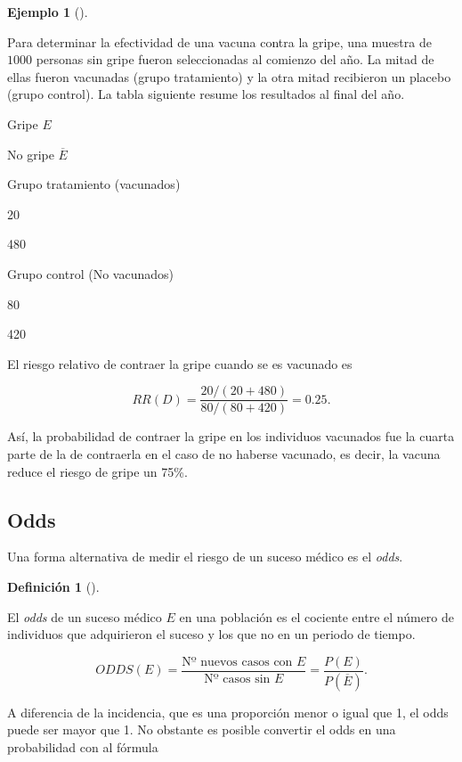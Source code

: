 \documentclass[
  spanish,
  a4paper,
]{scrreport}
\theoremstyle{plain}
\theoremstyle{definition}
\newtheorem{example}{Ejemplo}[chapter]
\theoremstyle{definition}
\newtheorem{definition}{Definición}[chapter]
\theoremstyle{remark}
\begin{document}
\begin{example}[]\protect\hypertarget{exm-riesgo-relativo}{}\label{exm-riesgo-relativo}

Para determinar la efectividad de una vacuna contra la gripe, una
muestra de \(1000\) personas sin gripe fueron seleccionadas al comienzo
del año. La mitad de ellas fueron vacunadas (grupo tratamiento) y la
otra mitad recibieron un placebo (grupo control). La tabla siguiente
resume los resultados al final del año.

Gripe \(E\)

No gripe \(\overline E\)

Grupo tratamiento (vacunados)

20

480

Grupo control (No vacunados)

80

420

El riesgo relativo de contraer la gripe cuando se es vacunado es

\[RR(D) = \frac{20/(20+480)}{80/(80+420)} = 0.25.\]

Así, la probabilidad de contraer la gripe en los individuos vacunados
fue la cuarta parte de la de contraerla en el caso de no haberse
vacunado, es decir, la vacuna reduce el riesgo de gripe un 75\%.

\end{example}

\subsection{Odds}\label{odds}

Una forma alternativa de medir el riesgo de un suceso médico es el
\emph{odds}.

\begin{definition}[]\protect\hypertarget{def-odds}{}\label{def-odds}

El \emph{odds} de un suceso médico \(E\) en una población es el cociente
entre el número de individuos que adquirieron el suceso y los que no en
un periodo de tiempo.

\[ODDS(E)=\frac{\mbox{Nº nuevos casos con $E$}}{\mbox{Nº casos sin $E$}}=\frac{P(E)}{P(\overline E)}.\]

\end{definition}

A diferencia de la incidencia, que es una proporción menor o igual que
1, el odds puede ser mayor que 1. No obstante es posible convertir el
odds en una probabilidad con al fórmula
\end{document}
